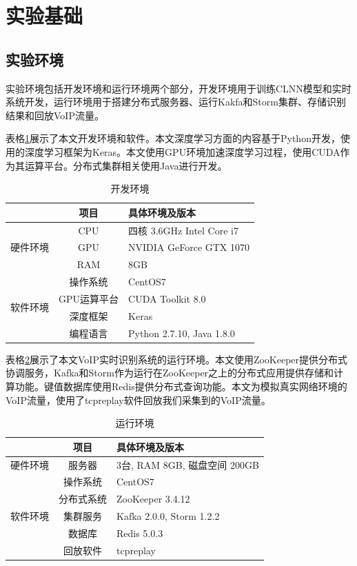 \section{实验基础}
\subsection{实验环境}
实验环境包括开发环境和运行环境两个部分，开发环境用于训练CLNN模型和实时系统开发，运行环境用于搭建分布式服务器、运行Kakfa和Storm集群、存储识别结果和回放VoIP流量。

表格\ref{tab:dev}展示了本文开发环境和软件。本文深度学习方面的内容基于Python开发，使用的深度学习框架为Keras。本文使用GPU环境加速深度学习过程，使用CUDA作为其运算平台。分布式集群相关使用Java进行开发。
\begin{table} [htb]
\caption{开发环境}\label{tab:dev}
\small
\centering
{
\begin{tabular}{ccl}
  \toprule
          &   项目 &   具体环境及版本\\
  \midrule
       \multirow{3}{*}{硬件环境}  & CPU &   四核 3.6GHz Intel Core i7 \\
                 &    GPU    &  NVIDIA GeForce GTX 1070  \\
                 &    RAM    &  8GB  \\ 
  \midrule
       \multirow{4}{*}{软件环境} & 操作系统 & CentOS7  \\ 
                 & GPU运算平台 & CUDA Toolkit 8.0\\
                 &    深度框架 & Keras \\
                 &   编程语言 & Python 2.7.10, Java 1.8.0\\
 \bottomrule
\end{tabular}
}
\end{table}

表格\ref{tab:runtime}展示了本文VoIP实时识别系统的运行环境。本文使用ZooKeeper提供分布式协调服务，Kafka和Storm作为运行在ZooKeeper之上的分布式应用提供存储和计算功能。键值数据库使用Redis提供分布式查询功能。本文为模拟真实网络环境的VoIP流量，使用了tcpreplay软件回放我们采集到的VoIP流量。
\begin{table} [htb]
\caption{运行环境}\label{tab:runtime}
\small
\centering
{
\begin{tabular}{ccl}
  \toprule
          &   项目 &   具体环境及版本\\
  \midrule
       \multirow{1}{*}{硬件环境}  & 服务器 &  3台, RAM 8GB, 磁盘空间 200GB  \\
  \midrule
       \multirow{5}{*}{软件环境} & 操作系统 & CentOS7  \\ 
                 &    分布式系统 & ZooKeeper 3.4.12 \\
                 & 集群服务 &Kafka 2.0.0, Storm 1.2.2\\
                 &    数据库 & Redis 5.0.3 \\
                 &   回放软件 & tcpreplay\\
 \bottomrule
\end{tabular}
}
\end{table}


